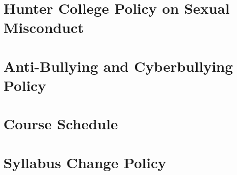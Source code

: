 \documentclass[11pt]{article} %
\begin{document}
\section*{Hunter College Policy on Sexual Misconduct}

\section*{Anti-Bullying and Cyberbullying Policy}

\section*{Course Schedule}

\section*{Syllabus Change Policy}

\end{document}
